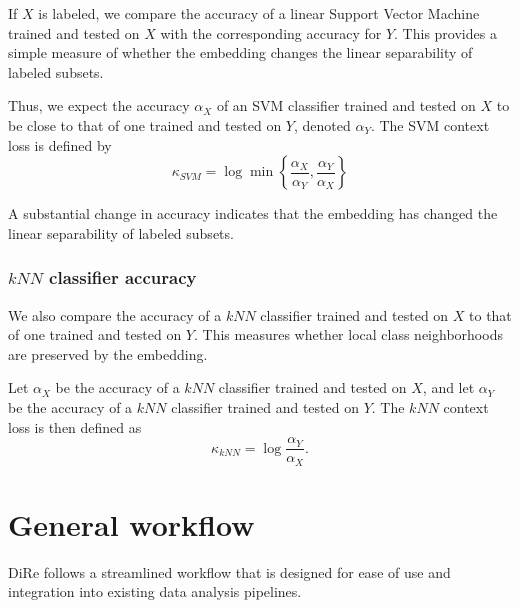 \documentclass[11pt]{article}
\begin{document}
If $X$ is labeled, we compare the accuracy of a linear Support Vector Machine trained and tested on $X$ with the corresponding accuracy for $Y$. This provides a simple measure of whether the embedding changes the linear separability of labeled subsets.

Thus, we expect the accuracy $\alpha_X$ of an SVM classifier trained and tested on $X$ to be close to that of one trained and tested on $Y$, denoted $\alpha_Y$. The SVM context loss is defined by
\[
\kappa_{SVM} = \log \min\left\{ \frac{\alpha_X}{\alpha_Y}, \frac{\alpha_Y}{\alpha_X} \right\}
\]

A substantial change in accuracy indicates that the embedding has changed the linear separability of labeled subsets.

\subsubsection{\texorpdfstring{$kNN$}{kNN} classifier accuracy}

We also compare the accuracy of a $kNN$ classifier trained and tested on $X$ to that of one trained and tested on $Y$. This measures whether local class neighborhoods are preserved by the embedding.

Let $\alpha_X$ be the accuracy of a $kNN$ classifier trained and tested on $X$, and let $\alpha_Y$ be the accuracy of a $kNN$ classifier trained and tested on $Y$. The $kNN$ context loss is then defined as 
\[
\kappa_{kNN} = \log \frac{\alpha_Y}{\alpha_X}.
\]


\section{General workflow}
DiRe follows a streamlined workflow that is designed for ease of use and integration into existing data analysis pipelines.
\end{document}
